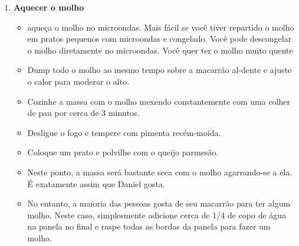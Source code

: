 \documentclass [11pt, letterpaper] {article}
\newcommand \fileName {DanielsPasta}
\begin{document}
\begin {description}
\begin {enumerate}
\begin {itemize}
\item Verifique após 7 minutos:
\begin {itemize}
\item Se parece que a massa está cozinhando rapidamente e ainda há muito líquido, deixe cozinhar descoberto em maior calor por um minuto ou dois para evaporar a água mais rapidamente.
\item Se parece que está ficando seco e o passado ainda não é bastante al-dente, adicione mais 1/2 xícara de água e cozinhe-o coberto um pouco mais.
\end {itemize}
\item Cozinhe até o líquido evaporar e a massa é muito al-dente (o tempo total de cozedura deve ser de 8 a 10 minutos).
\end {itemize}
\item {\bf Aquecer o molho}
\begin {itemize}
\item aqueça o molho no microondas. Mais fácil se você tiver repartido o molho em pratos pequenos com microondas e congelado. Você pode descongelar o molho diretamente no microondas. Você quer ter o molho muito quente
\item Dump todo o molho ao mesmo tempo sobre a macarrão al-dente e ajuste o calor para moderar o alto.
\item Cozinhe a massa com o molho mexendo constantemente com uma colher de pau por cerca de 3 minutos.
\item Desligue o fogo e tempere com pimenta recém-moída.
\item Coloque um prato e polvilhe com o queijo parmesão.
\item Neste ponto, a massa será bastante seca com o molho agarrando-se a ela. É exatamente assim que Daniel gosta.
\item No entanto, a maioria das pessoas gosta de seu macarrão para ter algum molho. Neste caso, simplesmente adicione cerca de 1/4 de copo de água na panela no final e raspe todas as bordas da panela para fazer um molho.
\end {itemize}
\end {enumerate}
\end {description}


\end{document}
